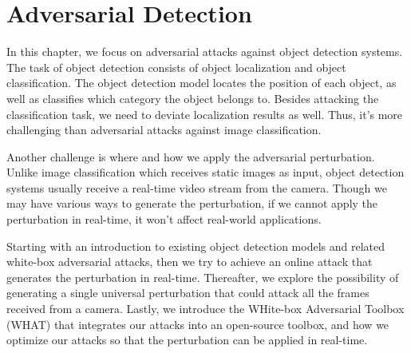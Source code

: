 \chapter{Adversarial Detection}
\label{chpt:detection}


In this chapter, we focus on adversarial attacks against object detection systems. The task of object detection consists of object localization and object classification. The object detection model locates the position of each object, as well as classifies which category the object belongs to. Besides attacking the classification task, we need to deviate localization results as well. Thus, it's more challenging than adversarial attacks against image classification.

Another challenge is where and how we apply the adversarial perturbation. Unlike image classification which receives static images as input, object detection systems usually receive a real-time video stream from the camera. Though we may have various ways to generate the perturbation, if we cannot apply the perturbation in real-time, it won't affect real-world applications.

Starting with an introduction to existing object detection models and related white-box adversarial attacks, then we try to achieve an online attack that generates the perturbation in real-time. Thereafter, we explore the possibility of generating a single universal perturbation that could attack all the frames received from a camera. Lastly, we introduce the WHite-box Adversarial Toolbox (WHAT) that integrates our attacks into an open-source toolbox, and how we optimize our attacks so that the perturbation can be applied in real-time.



